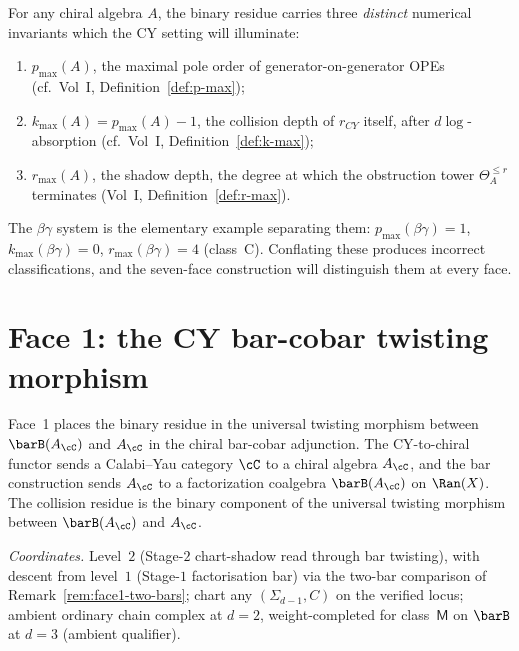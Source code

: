 \begin{remark}
\label{rem:cy-three-invariants}
For any chiral algebra $A$, the binary residue carries three
\emph{distinct} numerical invariants which the CY setting will
illuminate:
\begin{enumerate}[label=(\roman*)]
\item $p_{\max}(A)$, the maximal pole order of generator-on-generator
OPEs (cf.\ Vol~I, Definition~\ref{def:p-max});
\item $k_{\max}(A) = p_{\max}(A) - 1$, the collision depth of $r_{CY}$
itself, after $d\log$-absorption (cf.\ Vol~I,
Definition~\ref{def:k-max});
\item $r_{\max}(A)$, the shadow depth, the degree at which the
obstruction tower $\Theta_A^{\leq r}$ terminates (Vol~I,
Definition~\ref{def:r-max}).
\end{enumerate}
The $\beta\gamma$ system is the elementary example separating them:
$p_{\max}(\beta\gamma) = 1$, $k_{\max}(\beta\gamma) = 0$,
$r_{\max}(\beta\gamma) = 4$ (class~C). Conflating these produces
incorrect classifications, and the seven-face construction will distinguish
them at every face.
\end{remark}


\section{Face 1: the CY bar-cobar twisting morphism}
\label{sec:face1-bar-cobar}

Face~1 places the binary residue in the universal twisting morphism between $\barB(A_\cC)$ and $A_\cC$ in the chiral bar-cobar adjunction. The CY-to-chiral
functor sends a Calabi--Yau category $\cC$ to a chiral algebra
$A_\cC$, and the bar construction sends $A_\cC$ to a factorization
coalgebra $\barB(A_\cC)$ on $\Ran(X)$. The collision residue is the
binary component of the universal twisting morphism between
$\barB(A_\cC)$ and $A_\cC$.

\smallskip
\noindent\emph{Coordinates.} Level~$2$ \textup{(}Stage-$2$
chart-shadow read through bar twisting\textup{)}, with descent from
level~$1$ \textup{(}Stage-$1$ factorisation bar\textup{)} via the
two-bar comparison of Remark~\ref{rem:face1-two-bars}; chart any
$(\Sigma_{d-1}, C)$ on the verified locus; ambient ordinary chain
complex at $d = 2$, weight-completed for class~$\mathsf M$ on
$\barB$ at $d = 3$ (ambient qualifier).

